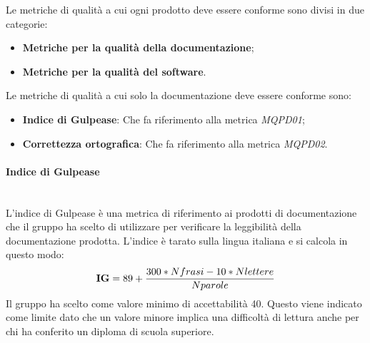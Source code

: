 \newpage
{}
Le metriche di qualità a cui ogni prodotto deve essere conforme sono divisi in due categorie:
\begin{itemize}
	\item \textbf{Metriche per la qualità della documentazione};
	\item \textbf{Metriche per la qualità del software}.
\end{itemize}
Le metriche di qualità a cui solo la documentazione deve essere conforme sono:
\begin{itemize}
	\item \textbf{Indice di Gulpease}: Che fa riferimento alla metrica \textit{MQPD01};
	\item \textbf{Correttezza ortografica}: Che fa riferimento alla metrica \textit{MQPD02}.
\end{itemize}
\paragraph{Indice di Gulpease}\mbox{}\\
L'indice di Gulpease è una metrica di riferimento ai prodotti di documentazione che il gruppo ha scelto di utilizzare per verificare la leggibilità della documentazione prodotta. L'indice è tarato sulla lingua italiana e si calcola in questo modo:
\begin{align*}
	\centering
	\textbf{IG} = 89 + \frac{300 * Nfrasi - 10 * Nlettere}{Nparole}
\end{align*}
Il gruppo ha scelto come valore minimo di accettabilità 40. Questo viene indicato come limite dato che un valore minore implica una difficoltà di lettura anche per chi ha conferito un diploma di scuola superiore.

